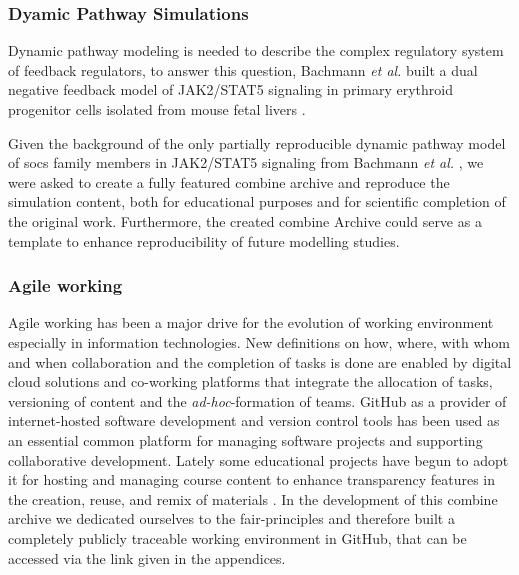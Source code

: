 \subsubsection*{Dyamic Pathway Simulations}
Dynamic pathway modeling is needed to describe the complex regulatory system of feedback regulators, to answer this question, Bachmann \textit{et al.} built a dual negative feedback model of JAK2/STAT5 signaling in primary erythroid progenitor cells isolated from mouse fetal livers \cite{bachmannmodel}.

Given the background of the only partially reproducible dynamic pathway model of \ac{socs} family members in JAK2/STAT5 signaling from Bachmann \textit{et al.} \cite{bachmannmodel}, we were asked to create a fully featured \ac{combine} archive and reproduce the simulation content, both for educational purposes and for scientific completion of the original work. Furthermore, the created \ac{combine} Archive could serve as a template to enhance reproducibility of future modelling studies.

\subsubsection*{Agile working}
Agile working has been a major drive for the evolution of working environment especially in information technologies. New definitions on how, where, with whom and when collaboration and the completion of tasks is done are enabled by digital cloud solutions and co-working platforms that integrate the allocation of tasks, versioning of content and the \textit{ad-hoc}-formation of teams. GitHub as a provider of internet-hosted software development and version control tools has been used as an essential common platform for managing software projects and supporting collaborative development. Lately some educational projects have begun to adopt it for hosting and managing course content to enhance transparency features in the creation, reuse, and remix of materials \cite{github, Knegendorf.}. In the development of this \ac{combine} archive we dedicated ourselves to the \acs{fair}-principles and therefore built a completely publicly traceable working environment in GitHub, that can be accessed via the link given in the appendices.

